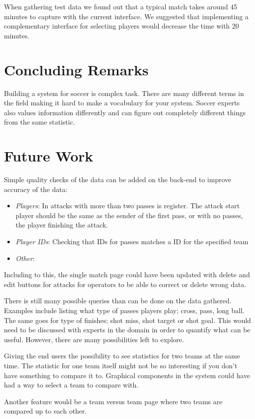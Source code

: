 When gathering test data we found out that a typical match takes around 45 minutes to capture with the current interface. We suggested that implementing a complementary interface for selecting players would decrease the time with 20 minutes.

\section{Concluding Remarks}

Building a system for soccer is complex task. There are many different terms in the field making it hard to make a vocabulary for your system. Soccer experts also values information differently and can figure out completely different things from the same statistic. 

\section{Future Work}

Simple quality checks of the data can be added on the back-end to improve accuracy of the data:

\begin{itemize}
\item \emph{Players}: In attacks with more than two passes is register. The attack start player should be the same as the sender of the first pass, or with no passes, the player finishing the attack. 
\item \emph{Player IDs}: Checking that IDs for passes matches a ID for the specified team
\item \emph{Other}: 
\end{itemize}

Including to this, the single match page could have been updated with delete and edit buttons for attacks for operators to be able to correct or delete wrong data.

There is still many possible queries than can be done on the data gathered. Examples include listing what type of passes players play; cross, pass, long ball. The same goes for type of finishes; shot miss, shot target or shot goal. This would need to be discussed with experts in the domain in order to quantify what can be useful. However, there are many possibilities left to explore. 

Giving the end users the possibility to see statistics for two teams at the same time. The statistic for one team itself might not be so interesting if you don't have something to compare it to. Graphical components in the system could have had a way to select a team to compare with.

Another feature would be a team versus team page where two teams are compared up to each other.





